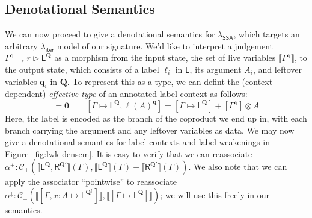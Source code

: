 \documentclass[acmsmall,screen,review]{acmart}
\newcommand{\mc}[1]{\ensuremath{\mathcal{#1}}}
\newcommand{\mb}[1]{\ensuremath{\mathbf{#1}}}
\newcommand{\ms}[1]{\ensuremath{\mathsf{#1}}}
\newcommand{\haslb}[4]{#1 \vdash_{#2} #3 \rhd #4}
\newcommand{\etoty}[1]{[#1]}
\newcommand{\ltoty}[2]{[#1 \mapsto #2]}
\newcommand{\dnt}[1]{\llbracket{#1}\rrbracket}
\newcommand{\subiterexp}{\texorpdfstring{\(\lambda_{\ms{iter}}\)}{lambda-iter}}
\newcommand{\isotopessa}{\(\lambda_{\ms{SSA}}\)}
\newcommand{\zeroqv}[1]{#1^\uparrow}
\begin{document}
\subsection{Denotational Semantics}

We can now proceed to give a denotational semantics for \isotopessa{}, which targets an arbitrary
\subiterexp{} model of our signature. We'd like to interpret a judgement 
$\haslb{\Gamma^{\mb{q}}}{\epsilon}{r}{\ms{L}^{\mb{Q}}}$ as a morphism from the input state, 
the set of live variables $\dnt{\Gamma^{\mb{q}}}$, to the output state, which consists of a label 
$\ell_i$ in $\ms{L}$, its argument $A_i$, and leftover variables $\mb{q}_i$ in $\mb{Q}$. To 
represent this as a type, we can defint the (context-dependent) \emph{effective type} of an
annotated label context as follows:
\begin{equation*}
  \ltoty{\Gamma}{\cdot} = \mb{0} \qquad
  \ltoty{\Gamma}{\ms{L}^{\mb{Q}}, \ell(A)^{\mb{q}}} 
    = \ltoty{\Gamma}{\ms{L}^{\mb{Q}}} + \etoty{\Gamma^{\mb{q}}} \otimes A
\end{equation*}
Here, the label is encoded as the branch of the coproduct we end up in, with each branch carrying
the argument and any leftover variables as data. We may now give a denotational semantics for label 
contexts and label weakenings in Figure~\ref{fig:lwk-densem}. 
It is easy to verify that we can reassociate 
$
\alpha^+ : \mc{C}_\bot(
  \dnt{\ms{L}^{\mb{Q}}, \ms{R}^{\mb{Q}'}}(\Gamma),
  \dnt{\ms{L}^{\mb{Q}}}(\Gamma) + \dnt{\ms{R}^{\mb{Q}'}}(\Gamma)
)
$.
We also note that we can apply the 
associator ``pointwise'' to reassociate
$\alpha^\downarrow: \mc{C}_\bot(
  \dnt{\ltoty{\Gamma, x : A}{\ms{L}^{\zeroqv{\mb{Q}}}}}, 
  \dnt{\ltoty{\Gamma}{\ms{L}^{\mb{Q}}}}
)$; 
we will use this freely in our semantics. 
\end{document}
